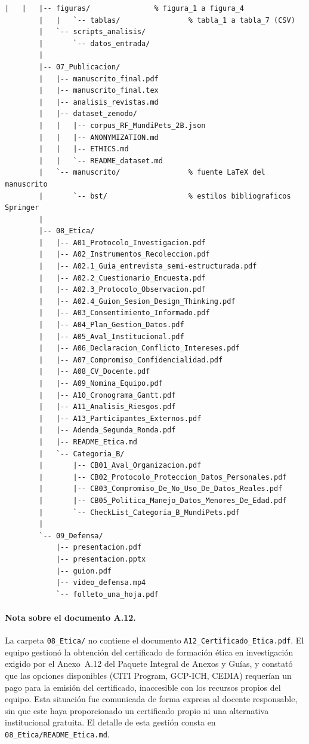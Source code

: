 \documentclass[journal,onecolumn]{IEEEtran}
\begin{document}
\begin{lstlisting}[style=csharp,caption={Estructura de carpetas del repositorio MundiPets-PFC-IngReq, conforme a la Sección 9.1 de la Guía y Rúbrica de la Entrega 4 (2B).},label={lst:estructura_repo}]
		|   |   |-- figuras/               % figura_1 a figura_4
		|   |   `-- tablas/                % tabla_1 a tabla_7 (CSV)
		|   `-- scripts_analisis/
		|       `-- datos_entrada/
		|
		|-- 07_Publicacion/
		|   |-- manuscrito_final.pdf
		|   |-- manuscrito_final.tex
		|   |-- analisis_revistas.md
		|   |-- dataset_zenodo/
		|   |   |-- corpus_RF_MundiPets_2B.json
		|   |   |-- ANONYMIZATION.md
		|   |   |-- ETHICS.md
		|   |   `-- README_dataset.md
		|   `-- manuscrito/                % fuente LaTeX del manuscrito
		|       `-- bst/                   % estilos bibliograficos Springer
		|
		|-- 08_Etica/
		|   |-- A01_Protocolo_Investigacion.pdf
		|   |-- A02_Instrumentos_Recoleccion.pdf
		|   |-- A02.1_Guia_entrevista_semi-estructurada.pdf
		|   |-- A02.2_Cuestionario_Encuesta.pdf
		|   |-- A02.3_Protocolo_Observacion.pdf
		|   |-- A02.4_Guion_Sesion_Design_Thinking.pdf
		|   |-- A03_Consentimiento_Informado.pdf
		|   |-- A04_Plan_Gestion_Datos.pdf
		|   |-- A05_Aval_Institucional.pdf
		|   |-- A06_Declaracion_Conflicto_Intereses.pdf
		|   |-- A07_Compromiso_Confidencialidad.pdf
		|   |-- A08_CV_Docente.pdf
		|   |-- A09_Nomina_Equipo.pdf
		|   |-- A10_Cronograma_Gantt.pdf
		|   |-- A11_Analisis_Riesgos.pdf
		|   |-- A13_Participantes_Externos.pdf
		|   |-- Adenda_Segunda_Ronda.pdf
		|   |-- README_Etica.md
		|   `-- Categoria_B/
		|       |-- CB01_Aval_Organizacion.pdf
		|       |-- CB02_Protocolo_Proteccion_Datos_Personales.pdf
		|       |-- CB03_Compromiso_De_No_Uso_De_Datos_Reales.pdf
		|       |-- CB05_Politica_Manejo_Datos_Menores_De_Edad.pdf
		|       `-- CheckList_Categoria_B_MundiPets.pdf
		|
		`-- 09_Defensa/
		    |-- presentacion.pdf
		    |-- presentacion.pptx
		    |-- guion.pdf
		    |-- video_defensa.mp4
		    `-- folleto_una_hoja.pdf
	\end{lstlisting}

	\paragraph{Nota sobre el documento A.12.}
	La carpeta \texttt{08\_Etica/} no contiene el documento
	\texttt{A12\_Certificado\_Etica.pdf}. El equipo gestionó la obtención del
	certificado de formación ética en investigación exigido por el Anexo~A.12
	del Paquete Integral de Anexos y Guías, y constató que las opciones
	disponibles (CITI Program, GCP-ICH, CEDIA) requerían un pago para la
	emisión del certificado, inaccesible con los recursos propios del equipo.
	Esta situación fue comunicada de forma expresa al docente responsable, sin
	que este haya proporcionado un certificado propio ni una alternativa
	institucional gratuita. El detalle de esta gestión consta en
	\texttt{08\_Etica/README\_Etica.md}.
	
\end{document}
